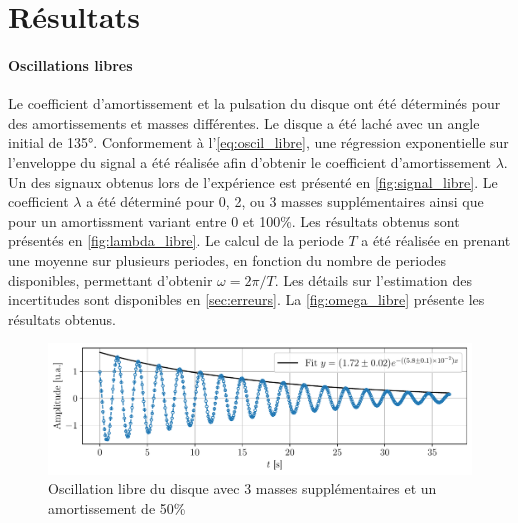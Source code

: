 \section{Résultats}

\paragraph{Oscillations libres}
Le coefficient d'amortissement et la pulsation du disque ont été déterminés pour des amortissements et masses différentes. Le disque a été laché avec un angle initial de 135°. Conformement à l'\autoref{eq:oscil_libre}, une régression exponentielle sur l'enveloppe du signal a été réalisée afin d'obtenir le coefficient d'amortissement \(\lambda\). Un des signaux obtenus lors de l'expérience est présenté en \autoref{fig:signal_libre}. Le coefficient \(\lambda\) a été déterminé pour 0, 2, ou 3 masses supplémentaires ainsi que pour un amortissment variant entre 0 et 100\%. Les résultats obtenus sont présentés en \autoref{fig:lambda_libre}. Le calcul de la periode \(T\) a été réalisée en prenant une moyenne sur plusieurs periodes, en fonction du nombre de periodes disponibles, permettant d'obtenir \(\omega = 2 \pi / T\). Les détails sur l'estimation des incertitudes sont disponibles en \autoref{sec:erreurs}. La \autoref{fig:omega_libre} présente les résultats obtenus.

\begin{figure}[h]
    \centering
    \includegraphics[width=0.98\linewidth]{figures/I3_50_nomot_fitted.pdf}
    \caption{Oscillation libre du disque avec 3 masses supplémentaires et un amortissement de 50\%}
    \label{fig:signal_libre}
\end{figure}

